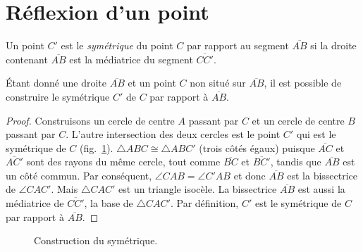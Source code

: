 
\section{Réflexion d'un point}\label{s.reflection}

\begin{definition}
Un point $C'$ est le \emph{symétrique} du point $C$ par rapport au segment  $\overline{AB}$ si  la droite contenant $\overline{AB}$ est la médiatrice du segment $\overline{CC'}$.
\end{definition}

\begin{theorem}\label{thm.compass-reflection}
Étant donné une droite $\overline{AB}$ et un point $C$ non situé sur $\overline{AB}$, il est possible de construire le symétrique $C'$ de $C$ par rapport à $\overline{AB}$.
\end{theorem}

\begin{proof} 
Construisons un cercle de centre $A$ passant par $C$ et un cercle de centre $B$ passant par $C$. L'autre intersection des deux cercles est le point $C'$ qui est le  symétrique de $C$ (fig.~\ref{f.compass-reflection}).
$\triangle ABC \cong \triangle ABC'$ (trois côtés égaux) puisque $\overline{AC}$ et $\overline{AC'}$ sont des rayons du même cercle, tout comme $\overline{BC}$ et $\overline{BC'}$, tandis que  $\overline{AB}$ est un côté commun. Par conséquent, $\angle CAB = \angle C'AB$ et donc $\overline{AB}$ est la bissectrice de $\angle CAC'$. Mais $\triangle CAC'$ est un triangle isocèle. La bissectrice  $\overline{AB}$ est aussi la médiatrice de $\overline{CC'}$, la base de $\triangle CAC'$. Par définition, $C'$ est le symétrique de $C$ par rapport à $\overline{AB}$.
\end{proof}

\begin{figure}[t]
\centering
{}
\caption{Construction du symétrique.}\label{f.compass-reflection}
\end{figure}


